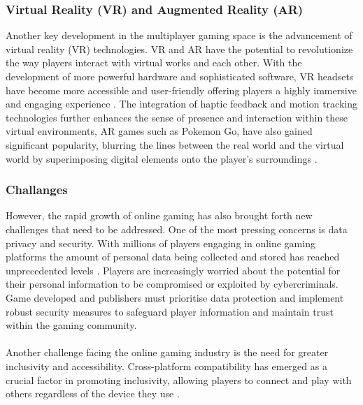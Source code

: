 \subsubsection{Virtual Reality (VR) and Augmented Reality (AR)}
Another key development in the multiplayer gaming space is the advancement of virtual reality (VR) technologies. VR and AR have the potential to revolutionize the way players interact with virtual works and each other. With the development of more powerful hardware and sophisticated software, VR headsets have become more accessible and user-friendly offering players a highly immersive and engaging experience \cite{advancement-onlinegaming}. The integration of haptic feedback and motion tracking technologies further enhances the sense of presence and interaction within these virtual environments, AR games such as Pokemon Go, have also gained significant popularity, blurring the lines between the real world and the virtual world by superimposing digital elements onto the player's surroundings \cite{advancement-onlinegaming}.

\subsubsection{Challanges}
However, the rapid growth of online gaming has also brought forth new challenges that need to be addressed. One of the most pressing concerns is data privacy and security. With millions of players engaging in online gaming platforms the amount of personal data being collected and stored has reached unprecedented levels \cite{future-onlinegaming}. Players are increasingly worried about the potential for their personal information to be compromised or exploited by cybercriminals. Game developed and publishers must prioritise data protection and implement robust security measures to safeguard player information and maintain trust within the gaming community.
\\
\noindent
\\
Another challenge facing the online gaming industry is the need for greater inclusivity and accessibility. Cross-platform compatibility has emerged as a crucial factor in promoting inclusivity, allowing players to connect and play with others regardless of the device they use \cite{future-onlinegaming}.

